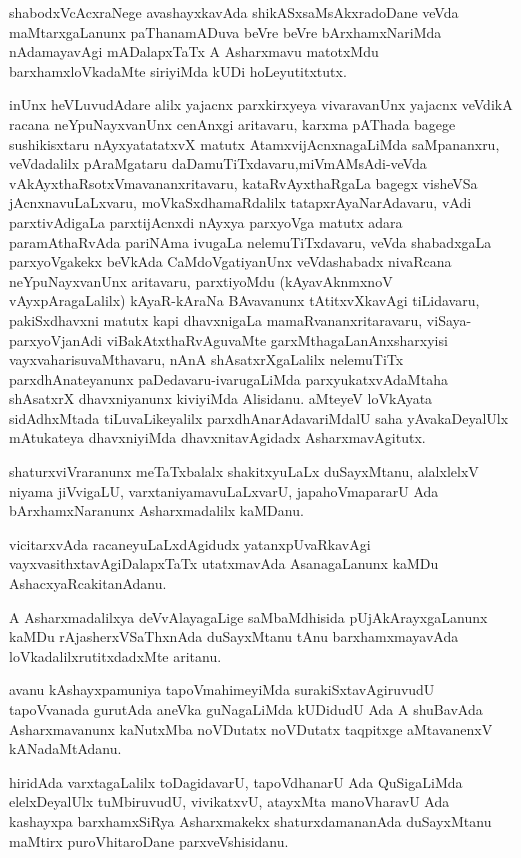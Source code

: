 shabodxVcAcxraNege avashayxkavAda shikASxsaMsAkxradoDane veVda maMtarxgaLanunx paThanamADuva beVre beVre bArxhamxNariMda nAdamayavAgi mADalapxTaTx A Asharxmavu matotxMdu barxhamxloVkadaMte siriyiMda kUDi hoLeyutitxtutx.

\newpage

inUnx heVLuvudAdare alilx yajacnx parxkirxyeya vivaravanUnx yajacnx veVdikA racana neYpuNayxvanUnx cenAnxgi aritavaru, karxma pAThada bagege sushikisxtaru nAyxya\-tatatxvX matutx AtamxvijAcnxnagaLiMda saMpananxru, veVdadalilx pAraMgataru daDamuTiTxdavaru,\break miVmAMsAdi-veVda vAkAyxthaRsotxVmavananxritavaru, kataR\-vAyxthaRgaLa bagegx \hbox{visheVSa} jAcnxnavuLaLxvaru, moVkaSxdhamaRdalilx tatapxrAyaNarAdavaru, vAdi parxtivAdigaLa parxti\-jAcnxdi nAyxya parxyoVga matutx adara paramAthaRvAda pariNAma ivugaLa nele\-muTiTxdavaru, veVda shabadxgaLa parxyoVgakekx beVkAda CaMdoVgatiyanUnx veVdashabadx nivaRcana neYpuNayxvanUnx aritavaru, parxti\-yoMdu (kAyavAknmxnoV vAyxpAra\-gaLalilx) kAyaR-kAraNa BAvavanunx tAtitxvXkavAgi tiLidavaru, pakiSx\-dhavxni matutx kapi dhavxni\-gaLa mamaRvananxritaravaru, viSaya-parxyoVjanAdi viBakAtxthaRvAguvaMte garxMtha\-gaLa\-nAnxsharxyisi vayxvaharisuvaMthavaru, nAnA shAsatxrXgaLalilx nelemuTiTx parxdhAnateyanunx paDe\-davaru-ivaru\-gaLiMda parxyukatxvAdaMtaha shAsatxrX dhavxniyanunx kiviyiMda Alisidanu. aMteyeV loVkAyata sidAdhxMtada tiLuvaLikeyalilx parxdhAnarAdavariMdalU saha yAvakaDeyalUlx mAtukateya dhavxniyiMda dhavxnitavAgidadx AsharxmavAgitutx.

shaturxviVraranunx meTaTxbalalx shakitxyuLaLx duSayxMtanu, alalxlelxV niyama jiVvigaLU, varxtaniyamavuLaLx\-varU, japahoVmapararU Ada bArxhamxNaranunx Asharxmadalilx kaMDanu.

vicitarxvAda racaneyuLaLxdAgidudx yatanxpUvaRkavAgi vayxvasithxtavAgiDalapxTaTx utatxmavAda AsanagaLanunx kaMDu AshacxyaRcakitanAdanu.

A Asharxmadalilxya deVvAlayagaLige saMbaMdhisida pUjAkArayxgaLanunx kaMDu rAjasherxVSaThxnAda duSayxM\-tanu tAnu barxhamxmayavAda loVkadalilxrutitxdadxMte aritanu.

avanu kAshayxpamuniya tapoVmahimeyiMda surakiSxtavAgiruvudU tapoV\-vanada gurutAda aneVka guNagaLiMda kUDidudU Ada A shuBavAda Asharxmavanunx kaNutxMba noVDutatx noVDutatx taqpitxge aMtavanenxV kANadaMtAdanu.

hiridAda varxtagaLalilx toDagidavarU, tapoVdhanarU Ada QuSigaLiMda elelxDeyalUlx tuMbiru\-vudU, vivikatxvU, atayxMta manoVharavU Ada kashayxpa barxhamxSiRya Asharxmakekx shaturxdamananAda duSayxM\-tanu maMtirx puroVhitaroDane parxveVshisidanu. 

